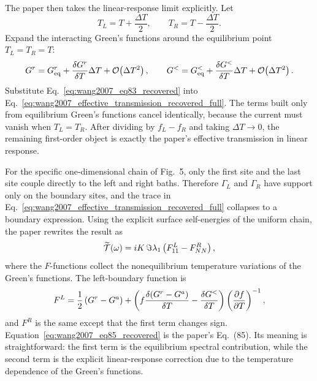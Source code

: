 The paper then takes the linear-response limit explicitly. Let
\begin{equation}
    T_L = T + \frac{\Delta T}{2},
    \qquad
    T_R = T - \frac{\Delta T}{2}.
    \label{eq:wang2007_temperature_split}
\end{equation}
Expand the interacting Green's functions around the equilibrium point $T_L=T_R=T$:
\begin{equation}
    G^r = G_{\rm eq}^r + \frac{\delta G^r}{\delta T}\Delta T + \mathcal{O}\!\left(\Delta T^2\right),
    \qquad
    G^< = G_{\rm eq}^< + \frac{\delta G^<}{\delta T}\Delta T + \mathcal{O}\!\left(\Delta T^2\right).
    \label{eq:wang2007_eq83_recovered}
\end{equation}
Substitute Eq.~\eqref{eq:wang2007_eq83_recovered} into Eq.~\eqref{eq:wang2007_effective_transmission_recovered_full}. The terms built only from equilibrium Green's functions cancel identically, because the current must vanish when $T_L=T_R$. After dividing by $f_L-f_R$ and taking $\Delta T\to 0$, the remaining first-order object is exactly the paper's effective transmission in linear response.

For the specific one-dimensional chain of Fig.~5, only the first site and the last site couple directly to the left and right baths. Therefore $\Gamma_L$ and $\Gamma_R$ have support only on the boundary sites, and the trace in Eq.~\eqref{eq:wang2007_effective_transmission_recovered_full} collapses to a boundary expression. Using the explicit surface self-energies of the uniform chain, the paper rewrites the result as
\begin{equation}
    \widetilde{\mathcal T}(\omega)
    = iK\,\Im \lambda_1\left( F_{11}^L - F_{NN}^R \right),
    \label{eq:wang2007_boundary_F_reduction}
\end{equation}
where the $F$-functions collect the nonequilibrium temperature variations of the Green's functions. The left-boundary function is
\begin{equation}
    F^L
    =
    \frac{1}{2}\left( G^r-G^a \right)
    +
    \left( 
        f\frac{\delta(G^r-G^a)}{\delta T}
        -
        \frac{\delta G^<}{\delta T}
     \right)
    \left( \frac{\partial f}{\partial T} \right)^{-1},
    \label{eq:wang2007_eq85_recovered}
\end{equation}
and $F^R$ is the same except that the first term changes sign. Equation~\eqref{eq:wang2007_eq85_recovered} is the paper's Eq.~(85). Its meaning is straightforward: the first term is the equilibrium spectral contribution, while the second term is the explicit linear-response correction due to the temperature dependence of the Green's functions.


